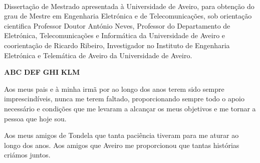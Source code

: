 \TitlePage

  \HEADER{\BAR}
         {\ThesisYear}
  \TITLE{\myName}
        {\TituloTese}
        {\ThesisTitle}
\EndTitlePage
\titlepage\ \endtitlepage %


%
%

\TitlePage
  \HEADER{}{\ThesisYear}
  \TITLE{\myName}
        {\TituloTese}
        {\ThesisTitle}
  \vskip 15mm
  \TEXT{}
       {Dissertação de Mestrado apresentada à Universidade de Aveiro, para obtenção do grau de Mestre em Engenharia Eletrónica e de Telecomunicações, sob orientação cientifica Professor Doutor António Neves, Professor do Departamento de Eletrónica, Telecomunicações e Informática da Universidade de Aveiro e coorientação de Ricardo Ribeiro, Investigador no Instituto de Engenharia Eletrónica e Telemática de Aveiro da Universidade de Aveiro.}
\EndTitlePage
\titlepage\ \endtitlepage %

\TitlePage
  \vspace*{55mm}
       {}
       {\textbf{ABC}}
  \vspace*{5mm}
       {\textbf{DEF}}
  \vspace*{5mm}
  \TEXT{}
       {\textbf{GHI}}
  \vspace*{5mm}
  \TEXT{}
       {\textbf{KLM}}
\EndTitlePage
\titlepage\ \endtitlepage %

\TitlePage
  \vspace*{55mm}
       {Aos meus pais e à minha irmã por ao longo dos anos terem sido sempre imprescindíveis, nunca me terem faltado, proporcionando sempre todo o apoio necessário e condições que me levaram a alcançar os meus objetivos e me tornar a pessoa que hoje sou.}
  
  \TEXT{}
       {Aos meus amigos de Tondela que tanta paciência tiveram para me aturar ao longo dos anos.}
       \TEXT{}
       {Aos amigos que Aveiro me proporcionou que tantas histórias criámos juntos.}

